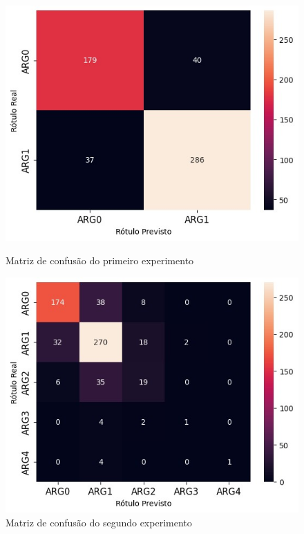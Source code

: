 \begin{figure}[h]
\begin{minipage}{.45\textwidth}
  \centering
  \includegraphics[width=\textwidth]{figure04.jpg}
  \caption{Matriz de confusão do primeiro experimento}
  \label{fig-04}
\end{minipage}%
\hfill
\begin{minipage}{.45\textwidth}
  \centering
  \includegraphics[width=\textwidth]{figure05.jpg}
  \caption{Matriz de confusão do segundo experimento}
  \label{fig-05}
\end{minipage}
\end{figure}

